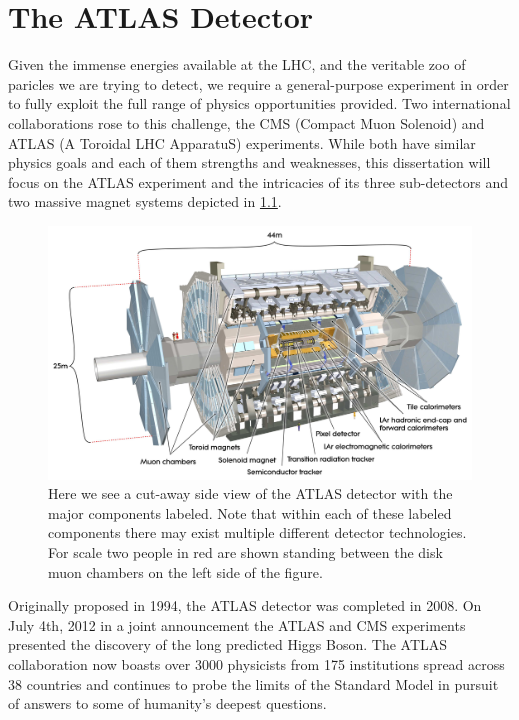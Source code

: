 \chapter{The ATLAS Detector} \label{chap:atlas}

Given the immense energies available at the LHC, and the veritable zoo of
paricles we are trying to detect, we require a general-purpose experiment in
order to fully exploit the full range of physics opportunities provided.  Two
international collaborations rose to this challenge, the CMS (Compact Muon
Solenoid) and ATLAS (A Toroidal LHC ApparatuS) experiments.  While both have
similar physics goals and each of them strengths and weaknesses, this
dissertation will focus on the ATLAS experiment and the intricacies of its three
sub-detectors and two massive magnet systems depicted in
\cref{fig:atlas_cutaway}.

\begin{figure}[!htbp]
  \begin{center}
    \includegraphics[width=0.9\linewidth]{figures/atlas/atlas_cutaway.pdf}
    \caption{ \cite{PERF-2007-01} Here we see a cut-away side view of the ATLAS
detector with the major components labeled.  Note that within each of these
labeled components there may exist multiple different detector technologies.
For scale two people in red are shown standing between the disk muon chambers on the
left side of the figure. }
    \label{fig:atlas_cutaway}
  \end{center}
\end{figure}

Originally proposed in 1994, the ATLAS detector was completed in 2008. On
July 4th, 2012 in a joint announcement the ATLAS and CMS experiments presented
the discovery of the long predicted Higgs Boson.  The ATLAS collaboration now boasts
over 3000 physicists from 175 institutions spread across 38 countries and
continues to probe the limits of the Standard Model in pursuit of answers to
some of humanity's deepest questions.


